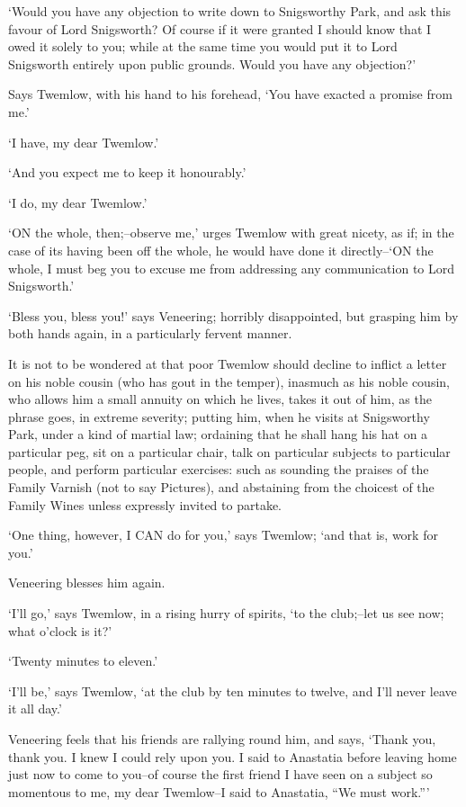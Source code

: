 ‘Would you have any objection to write down to Snigsworthy Park, and ask
this favour of Lord Snigsworth? Of course if it were granted I should
know that I owed it solely to you; while at the same time you would put
it to Lord Snigsworth entirely upon public grounds. Would you have any
objection?’

Says Twemlow, with his hand to his forehead, ‘You have exacted a promise
from me.’

‘I have, my dear Twemlow.’

‘And you expect me to keep it honourably.’

‘I do, my dear Twemlow.’

‘ON the whole, then;--observe me,’ urges Twemlow with great nicety, as
if; in the case of its having been off the whole, he would have done it
directly--‘ON the whole, I must beg you to excuse me from addressing any
communication to Lord Snigsworth.’

‘Bless you, bless you!’ says Veneering; horribly disappointed, but
grasping him by both hands again, in a particularly fervent manner.

It is not to be wondered at that poor Twemlow should decline to inflict
a letter on his noble cousin (who has gout in the temper), inasmuch
as his noble cousin, who allows him a small annuity on which he lives,
takes it out of him, as the phrase goes, in extreme severity; putting
him, when he visits at Snigsworthy Park, under a kind of martial law;
ordaining that he shall hang his hat on a particular peg, sit on a
particular chair, talk on particular subjects to particular people, and
perform particular exercises: such as sounding the praises of the Family
Varnish (not to say Pictures), and abstaining from the choicest of the
Family Wines unless expressly invited to partake.

‘One thing, however, I CAN do for you,’ says Twemlow; ‘and that is, work
for you.’

Veneering blesses him again.

‘I’ll go,’ says Twemlow, in a rising hurry of spirits, ‘to the
club;--let us see now; what o’clock is it?’

‘Twenty minutes to eleven.’

‘I’ll be,’ says Twemlow, ‘at the club by ten minutes to twelve, and I’ll
never leave it all day.’

Veneering feels that his friends are rallying round him, and says,
‘Thank you, thank you. I knew I could rely upon you. I said to Anastatia
before leaving home just now to come to you--of course the first friend
I have seen on a subject so momentous to me, my dear Twemlow--I said to
Anastatia, “We must work.”’

